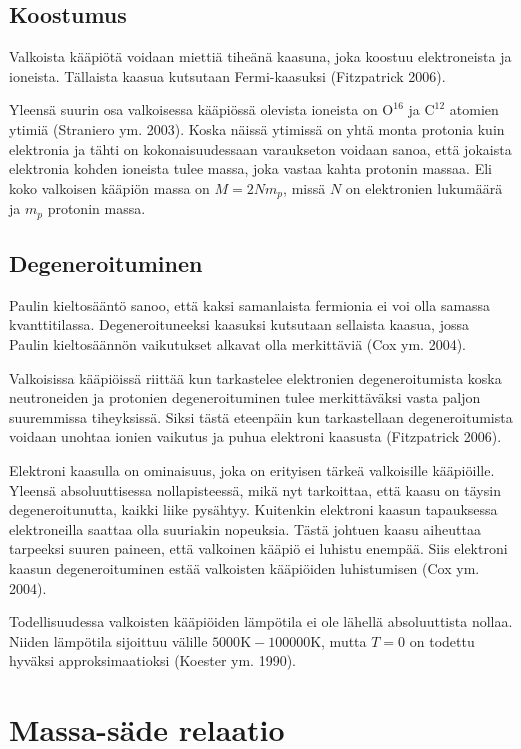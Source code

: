 \documentclass[12pt,a4paper,titlepage]{article}
\begin{document}
\subsection{Koostumus}

Valkoista kääpiötä voidaan miettiä tiheänä kaasuna, joka koostuu elektroneista ja ioneista. Tällaista kaasua kutsutaan Fermi-kaasuksi (Fitzpatrick 2006). 

Yleensä suurin osa valkoisessa kääpiössä olevista ioneista on $\mathrm{O}^{16}$ ja $\mathrm{C}^{12}$ atomien ytimiä (Straniero ym. 2003). Koska näissä ytimissä on yhtä monta protonia kuin elektronia ja tähti on kokonaisuudessaan varaukseton voidaan sanoa, että jokaista elektronia kohden ioneista tulee massa, joka vastaa kahta protonin massaa. Eli koko valkoisen kääpiön massa on $ M = 2 N m_p $, missä $N$ on elektronien lukumäärä ja $m_p$ protonin massa.

\subsection{Degeneroituminen}

Paulin kieltosääntö sanoo, että kaksi samanlaista fermionia ei voi olla samassa kvanttitilassa. Degeneroituneeksi kaasuksi kutsutaan sellaista kaasua, jossa Paulin kieltosäännön vaikutukset alkavat olla merkittäviä (Cox ym. 2004).

Valkoisissa kääpiöissä riittää kun tarkastelee elektronien degeneroitumista koska neutroneiden ja protonien degeneroituminen tulee merkittäväksi vasta paljon suuremmissa tiheyksissä. Siksi tästä eteenpäin kun tarkastellaan degeneroitumista voidaan unohtaa ionien vaikutus ja puhua elektroni kaasusta (Fitzpatrick 2006).

Elektroni kaasulla on ominaisuus, joka on erityisen tärkeä valkoisille kääpiöille. Yleensä absoluuttisessa nollapisteessä, mikä nyt tarkoittaa, että kaasu on täysin degeneroitunutta, kaikki liike pysähtyy. Kuitenkin elektroni kaasun tapauksessa elektroneilla saattaa olla suuriakin nopeuksia. Tästä johtuen kaasu aiheuttaa tarpeeksi suuren paineen, että valkoinen kääpiö ei luhistu enempää. Siis elektroni kaasun degeneroituminen estää valkoisten kääpiöiden luhistumisen (Cox ym. 2004).

Todellisuudessa valkoisten kääpiöiden lämpötila ei ole lähellä absoluuttista nollaa. Niiden lämpötila sijoittuu välille $5000 \mathrm{K}-100000 \mathrm{K}$, mutta $T = 0$ on todettu hyväksi approksimaatioksi (Koester ym. 1990).


\newpage
\section{Massa-säde relaatio}
\end{document}
